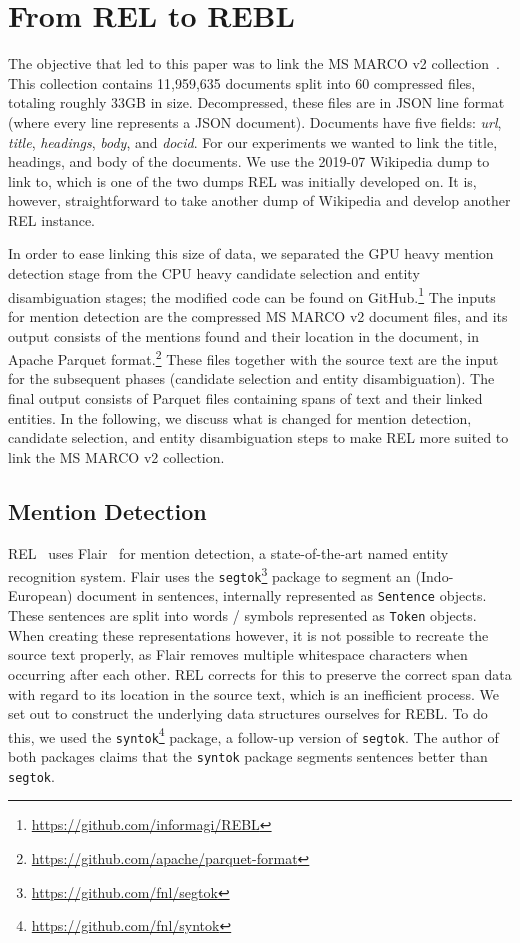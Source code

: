 \section{From REL to REBL}
The objective that led to this paper was to link the MS MARCO v2 collection~\cite{msmarco}. This collection contains 11,959,635 documents split into 60 compressed files, totaling roughly 33GB in size. Decompressed, these files are in JSON line format (where every line represents a JSON document). Documents have five fields: \textit{url}, \textit{title}, \textit{headings}, \textit{body}, and \textit{docid}. For our experiments we wanted to link the title, headings, and body of the documents.  We use the 2019-07 Wikipedia dump to link to, which is one of the two dumps REL was initially developed on. It is, however, straightforward to take another dump of Wikipedia and develop another REL instance. 

In order to ease linking this size of data, we separated the GPU heavy mention detection stage from the CPU heavy candidate selection and entity disambiguation stages; the modified code can be found on GitHub.\footnote{\url{https://github.com/informagi/REBL}}
The inputs for mention detection are the compressed MS MARCO v2 document files, and its output consists of the mentions found and their location in the document, in Apache Parquet format.\footnote{\url{https://github.com/apache/parquet-format}}
These files together with the source text are the input for the subsequent phases (candidate selection and entity disambiguation). The final output consists of Parquet files containing spans of text and their linked entities. 
In the following, we discuss what is changed for mention detection, candidate selection, and entity disambiguation steps to make REL more suited to link the MS MARCO v2 collection.  

\subsection{Mention Detection}
REL~\cite{REL} uses Flair~\cite{flair} for mention detection, a state-of-the-art named entity recognition system. Flair uses the \texttt{segtok}\footnote{\url{https://github.com/fnl/segtok}} package to segment an (Indo-European) document in sentences, internally represented as \texttt{Sentence} objects. These sentences are split into words / symbols represented as \texttt{Token} objects. When creating these representations however, it is not possible to recreate the source text properly, as Flair removes multiple whitespace characters when occurring after each other. REL corrects for this to preserve the correct span data with regard to its location in the source text, which is an inefficient process.
We set out to construct the underlying data structures ourselves for REBL. To do this, we used the \texttt{syntok}\footnote{\url{https://github.com/fnl/syntok}} package, a follow-up version of \texttt{segtok}. The author of both packages claims that the \texttt{syntok} package segments sentences better than \texttt{segtok}. 

